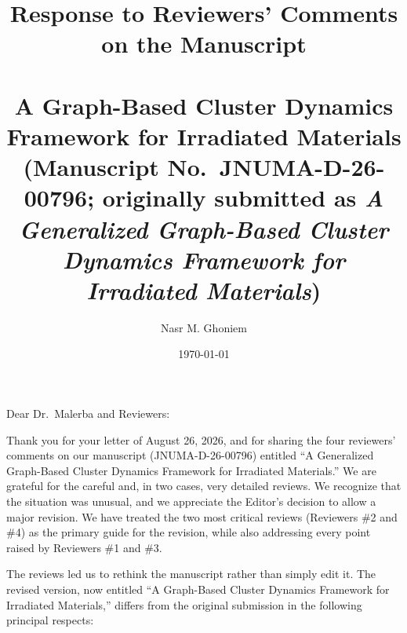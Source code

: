 \documentclass{article}
\title{Response to Reviewers' Comments on the Manuscript\\
~\\
\textbf{A Graph-Based Cluster Dynamics Framework for Irradiated Materials}\\[4pt]
\normalsize (Manuscript No.\ JNUMA-D-26-00796; originally submitted as \emph{A Generalized Graph-Based Cluster Dynamics Framework for Irradiated Materials})
}
\author{Nasr M. Ghoniem}
\affil{Department of Mechanical and Aerospace Engineering, University of California Los Angeles, Los Angeles, CA 90095, USA}
\date{\today}
\begin{document}
\maketitle
\sloppy

\noindent Dear Dr.\ Malerba and Reviewers:

Thank you for your letter of August 26, 2026, and for sharing the four reviewers' comments on our manuscript (JNUMA-D-26-00796) entitled ``A Generalized Graph-Based Cluster Dynamics Framework for Irradiated Materials.'' We are grateful for the careful and, in two cases, very detailed reviews. We recognize that the situation was unusual, and we appreciate the Editor's decision to allow a major revision. We have treated the two most critical reviews (Reviewers \#2 and \#4) as the primary guide for the revision, while also addressing every point raised by Reviewers \#1 and \#3.

The reviews led us to rethink the manuscript rather than simply edit it. The revised version, now entitled ``A Graph-Based Cluster Dynamics Framework for Irradiated Materials,'' differs from the original submission in the following principal respects:
\end{document}
